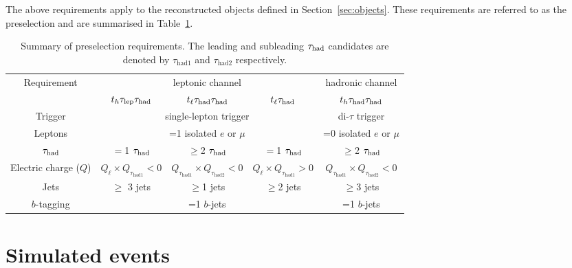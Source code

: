 \documentclass[PAPER, coverpage, atlasdraft=true, texlive=2016, UKenglish]{\ATLASLATEXPATH atlasdoc}
\begin{document}
The above requirements apply to the reconstructed objects defined in Section~\ref{sec:objects}.
These requirements are referred to as the preselection and are summarised in Table~\ref{tab:preselection}. 

\begin{table}[t!]
\caption{\small{Summary of preselection requirements. 
The leading and subleading $\tau_{\mathrm{had}}$ candidates are denoted by $\tau_{\mathrm{had1}}$ and $\tau_{\mathrm{had2}}$ respectively.}}
\begin{center}
\begin{tabular}{c|ccc|c}
\toprule\toprule
\multirow{2}{*}{Requirement} &  \multicolumn{3}{c|}{leptonic channel}  & \multicolumn{1}{c}{hadronic channel} \\ 
& $t_h\tau_{\mathrm{lep}} \tau_{\mathrm{had}}$ & $t_{\ell}\tau_{\mathrm{had}} \tau_{\mathrm{had}}$ &  $t_{\ell}\tau_{\mathrm{had}}$ & $t_h\tau_{\mathrm{had}} \tau_{\mathrm{had}}$\\
\midrule
Trigger & \multicolumn{3}{c|}{single-lepton trigger} & di-$\tau$ trigger  \\
Leptons  & \multicolumn{3}{c|}{=1 isolated $e$ or $\mu$}  & =0 isolated $e$ or $\mu$ \\
$\tau_{\mathrm{had}}$  & $=$1 $\tau_{\mathrm{had}}$ & $\geq$2 $\tau_{\mathrm{had}}$ & $=$1 $\tau_{\mathrm{had}}$ & $\geq$2 $\tau_{\mathrm{had}}$ \\
Electric charge ($Q$) & $Q_\ell \times Q_{\tau_{\mathrm{had1}}} < 0$ & $Q_{\tau_{\mathrm{had1}}} \times Q_{\tau_{\mathrm{had2}}} < 0$ & $Q_\ell \times Q_{\tau_{\mathrm{had1}}} > 0$ & $Q_{\tau_{\mathrm{had1}}} \times Q_{\tau_{\mathrm{had2}}} < 0$ \\
Jets  &   $\geq$ 3 jets & $\geq$1 jets & $\geq$2 jets & $\geq$3 jets \\
$b$-tagging & \multicolumn{3}{c|}{=1 $b$-jets} & =1 $b$-jets\\
\bottomrule\bottomrule
\end{tabular}
\label{tab:preselection}
\end{center}
\end{table}


%
\section{Simulated events}
\label{sec:simulations}
\end{document}
